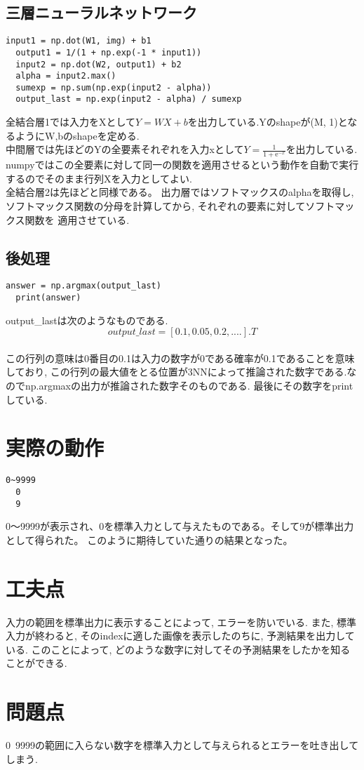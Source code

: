 \documentclass[a4paper,11pt]{jsarticle}
\begin{document}
\subsection{三層ニューラルネットワーク}

\begin{lstlisting}[caption = 3NN]
  input1 = np.dot(W1, img) + b1
  output1 = 1/(1 + np.exp(-1 * input1))
  input2 = np.dot(W2, output1) + b2
  alpha = input2.max()
  sumexp = np.sum(np.exp(input2 - alpha))
  output_last = np.exp(input2 - alpha) / sumexp
\end{lstlisting}
\par
全結合層1では入力をXとして$ Y = WX + b $を出力している.Yのshapeが(M, 1)となるようにW,bのshapeを定める.\\
中間層では先ほどのYの全要素それぞれを入力xとして$Y = \frac{1}{1 + \mathrm{e}^{-x}} $を出力している.
numpyではこの全要素に対して同一の関数を適用させるという動作を自動で実行するのでそのまま行列Xを入力としてよい.\\
全結合層2は先ほどと同様である。
出力層ではソフトマックスのalphaを取得し,ソフトマックス関数の分母を計算してから, それぞれの要素に対してソフトマックス関数を
適用させている.
\subsection{後処理}
\begin{lstlisting}[caption=after-processing]
  answer = np.argmax(output_last)
  print(answer)
\end{lstlisting}
output\_lastは次のようなものである.\\
$$output\_last = [0.1, 0.05, 0.2, ....].T$$\\
この行列の意味は0番目の0.1は入力の数字が0である確率が0.1であることを意味しており,
この行列の最大値をとる位置が3NNによって推論された数字である.なのでnp.argmaxの出力が推論された数字そのものである.
最後にその数字をprintしている.
\section{実際の動作}
\begin{lstlisting}[caption=result]
  0~9999
  0 
  9
\end{lstlisting}
0～9999が表示され、0を標準入力として与えたものである。そして9が標準出力として得られた。
このように期待していた通りの結果となった。

\section{工夫点}
入力の範囲を標準出力に表示することによって, エラーを防いでいる.
また, 標準入力が終わると, そのindexに適した画像を表示したのちに,
予測結果を出力している.
このことによって, どのような数字に対してその予測結果をしたかを知ることができる.

\section{問題点}
0~9999の範囲に入らない数字を標準入力として与えられるとエラーを吐き出してしまう.
\end{document}
